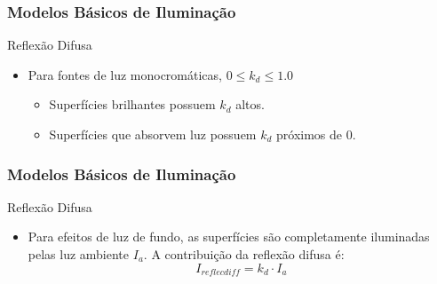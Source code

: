 \documentclass{beamer}
\begin{document}
\begin{frame}
\frametitle{Modelos Básicos de Iluminação}

	\begin{block}{Reflexão Difusa}
		\begin{itemize}
			\item Para fontes de luz monocromáticas, $0 \leq k_d \leq 1.0$
			\begin{itemize}
				\item Superfícies brilhantes possuem $k_d$ altos.
				\item Superfícies que absorvem luz possuem $k_d$ próximos de 0.
			\end{itemize}						 
		\end{itemize}
	\end{block}
	
\end{frame}

\begin{frame}
\frametitle{Modelos Básicos de Iluminação}

	\begin{block}{Reflexão Difusa}
		\begin{itemize}
			\item Para efeitos de luz de fundo, as superfícies são completamente iluminadas pelas luz ambiente $I_a$. A contribuição da reflexão difusa é:
				\begin{equation*}
					I_{reflecdiff} = k_d \cdot I_a
				\end{equation*}						 
		\end{itemize}
	\end{block}
	
\end{frame}



\end{document}
